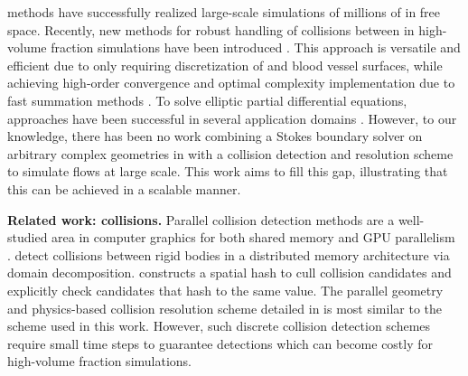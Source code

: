 \bie methods have successfully realized large-scale simulations of millions of \rbcs \cite{rahimian2010petascale} in free space.
Recently, new methods for robust handling of collisions between \rbcs in high-volume fraction simulations have been introduced \cite{lu2018parallel,Malhotra2017}. 
This approach is versatile and efficient due to only requiring discretization of
\rbcs and blood vessel surfaces, while achieving high-order convergence and optimal complexity implementation due to fast summation methods \cite{Veerapaneni2009b,Veerapaneni2011,rahimian2015,sorgentone2018highly,sorgentone20193d,af2016fast,Zhao2010}.
To solve elliptic partial differential equations, \bie approaches have been successful in several application domains \cite{YBZ,wala20183d,wala2018optimization,bruno2013high}.
However, to our knowledge, there has been no work combining a Stokes
boundary solver on arbitrary complex geometries in \threed with a
collision detection and resolution scheme to simulate \rbc flows at large scale.
This work aims to fill this gap, illustrating that this can  be
achieved in a scalable manner.


\textbf{Related work: collisions. }
Parallel collision detection methods are a well-studied area in computer graphics for both shared memory and GPU parallelism \cite{Liu2010,Mazhar2011,Kim2009}.
\cite{Iglberger2009,Du2017} detect collisions between rigid bodies in a distributed memory architecture via domain decomposition.
\cite{Pabst2010} constructs a spatial hash to cull collision candidates and explicitly check candidates that hash to the same value.
The parallel geometry and physics-based collision resolution scheme detailed in \cite{yan2019computing} is most similar to the scheme used in this work. 
However, such discrete collision detection schemes require small time steps to guarantee detections which can become costly for high-volume fraction simulations.
